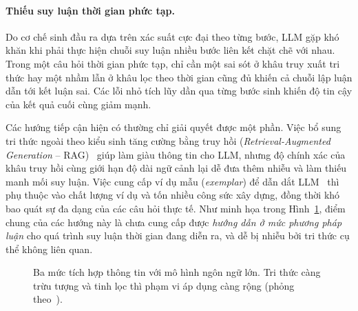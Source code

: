 \paragraph{Thiếu suy luận thời gian phức tạp.} Do cơ chế sinh đầu ra dựa trên xác suất cực đại
theo từng bước, LLM gặp khó khăn khi phải thực hiện chuỗi suy luận nhiều bước liên kết chặt chẽ
với nhau. Trong một câu hỏi thời gian phức tạp, chỉ cần một sai sót ở khâu truy xuất tri thức hay
một nhầm lẫn ở khâu lọc theo thời gian cũng đủ khiến cả chuỗi lập luận dẫn tới kết luận sai. Các
lỗi nhỏ tích lũy dần qua từng bước sinh khiến độ tin cậy của kết quả cuối cùng giảm mạnh.

Các hướng tiếp cận hiện có thường chỉ giải quyết được một phần. Việc bổ sung tri thức ngoài theo
kiểu sinh tăng cường bằng truy hồi (\textit{Retrieval-Augmented Generation} --
RAG)~\cite{lewis2020rag, baek2023kaping} giúp làm giàu thông tin cho LLM, nhưng độ chính xác của
khâu truy hồi cùng giới hạn độ dài ngữ cảnh lại dễ đưa thêm nhiễu và làm thiếu manh mối suy luận.
Việc cung cấp ví dụ mẫu (\textit{exemplar}) để dẫn dắt LLM~\cite{wei2022cot} thì phụ thuộc vào
chất lượng ví dụ và tốn nhiều công sức xây dựng, đồng thời khó bao quát sự đa dạng của các câu hỏi
thực tế. Như minh họa trong Hình~\ref{fig:three-levels}, điểm chung của các hướng này là chưa cung
cấp được \emph{hướng dẫn ở mức phương pháp luận} cho quá trình suy luận thời gian đang diễn ra, và
dễ bị nhiễu bởi tri thức cụ thể không liên quan.

\begin{figure}[ht]
  \centering
  \caption{Ba mức tích hợp thông tin với mô hình ngôn ngữ lớn. Tri thức càng trừu tượng và tinh
  lọc thì phạm vi áp dụng càng rộng (phỏng theo~\cite{chen2024ari}). }
  \label{fig:three-levels}
\end{figure}

